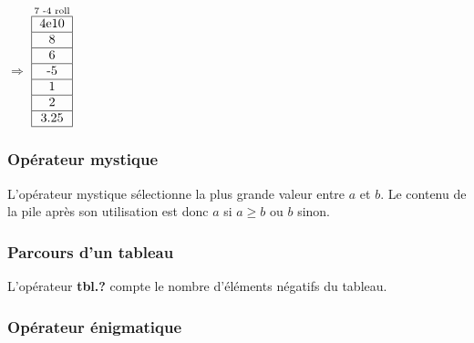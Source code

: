 \documentclass{article}
\newcommand{\key}[1]{{\bf #1}}
\begin{document}
$\Rightarrow$
$\stackrel{\text{7 -4 roll}}{
  \begin{tabular}{|c|}
    \hline 4e10 \\
    \hline 8 \\
    \hline 6 \\
    \hline -5 \\
    \hline 1 \\
    \hline 2 \\
    \hline 3.25 \\
    \hline
\end{tabular}}$

\subsubsection{Opérateur mystique}
L'opérateur mystique sélectionne la plus grande valeur entre $a$ et $b$. Le contenu de la pile après son utilisation est donc $a$ si $a \geq b$ ou $b$ sinon.

\subsubsection{Parcours d'un tableau}
L'opérateur \key{tbl.?} compte le nombre d'éléments négatifs du tableau.

\subsubsection{Opérateur énigmatique}
\end{document}
